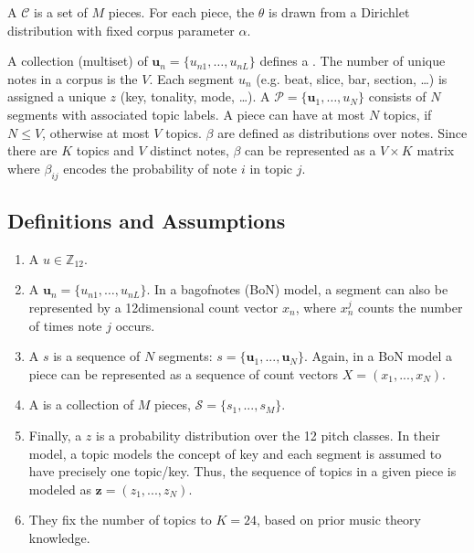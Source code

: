\documentclass[letterpaper,10pt,english]{sphinxmanual}
\begin{document}
\sphinxAtStartPar
A  \(\mathcal C\) is a set of \(M\) pieces. For each
piece, the  \(\theta\) is drawn from a
Dirichlet distribution with fixed corpus parameter \(\alpha.\)

\sphinxAtStartPar
A collection (multiset) of 
\(\boldsymbol{u}_n = \{u_{n1},\ldots,u_{nL}\}\) defines a
. The number of unique notes in a corpus is the  \(V\). Each segment \({u}_n\) (e.g. beat, slice, bar,
section, …) is assigned a unique  \(z\) (key,
tonality, mode, …). A 
\(\mathcal P = \{\boldsymbol{u}_1, \ldots, u_N\}\) consists of
\(N\) segments with associated topic labels. A piece can have at
most \(N\) topics, if \(N\leq V\), otherwise at most \(V\)
topics.  \(\beta\) are defined as distributions over
notes.
Since there are \(K\) topics and \(V\) distinct notes,
\(\beta\) can be represented as a \(V \times K\) matrix where
\(\beta_{ij}\) encodes the probability of note \(i\) in topic
\(j\).


\subsection{Definitions and Assumptions}
\label{\detokenize{5_notes:definitions-and-assumptions}}\begin{enumerate}
%
\item {} 
\sphinxAtStartPar
A  \(u \in \mathbb Z_{12}\).

\item {} 
\sphinxAtStartPar
A  \(\mathbf{u}_n = \{u_{n1}, \ldots{}, u_{nL}\}\). In a
bag\sphinxhyphen{}of\sphinxhyphen{}notes (BoN) model, a segment can also be represented by a
12\sphinxhyphen{}dimensional count vector \(x_n\), where \(x_n^j\) counts
the number of times note \(j\) occurs.

\item {} 
\sphinxAtStartPar
A  \(s\) is a sequence of \(N\) segments:
\(s=\{\mathbf u_1, ..., \mathbf u_N \}\). Again, in a BoN model a
piece can be represented as a sequence of count vectors
\(X=(x_1, ..., x_N)\).

\item {} 
\sphinxAtStartPar
A  is a collection of \(M\) pieces,
\(\mathcal S = \{s_1, ..., s_M\}\).

\item {} 
\sphinxAtStartPar
Finally, a  \(z\) is a probability distribution over the
12 pitch classes. In their model, a topic models the concept of key
and each segment is assumed to have precisely one topic/key. Thus,
the sequence of topics in a given piece is modeled as
\(\mathbf z = (z_1, ..., z_N)\).

\item {} 
\sphinxAtStartPar
They fix the number of topics to \(K=24\), based on prior music
theory knowledge.

\end{enumerate}
\end{document}
